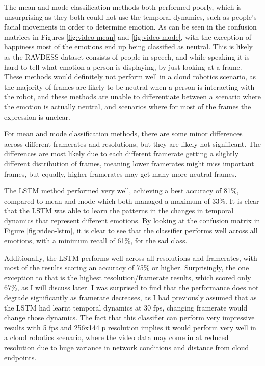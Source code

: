 \documentclass[sigconf]{acmart}
\begin{document}
{The mean and mode classification methods both performed poorly, which is
unsurprising as they both could not use the temporal dynamics, such as people's
facial movements in order to determine emotion. As can be seen in the
confusion matrices in Figures
\ref{fig:video-mean} and \ref{fig:video-mode}, with the exception of
happiness most of the emotions end up being classified as neutral. This is
likely as the RAVDESS dataset consists of people in speech, and while
speaking it is hard to tell what emotion a person is displaying, by just
looking at a frame. 
These methods would definitely not perform well in a cloud robotics scenario,
as the majority of frames are likely to be neutral when a person is
interacting with the robot, and these methods are unable to differentiate
between a scenario where the emotion is actually neutral, and scenarios where
for most of the frames the expression is unclear.

For mean and mode classification methods, there are some minor differences
across different framerates and resolutions, but they are likely not
significant. The differences are most likely due to each different framerate
getting a slightly different distribution of frames, meaning lower framerates
might miss important frames, but equally, higher framerates may get many more
neutral frames. 

The LSTM method performed very well, achieving a best accuracy of 81\%,
compared to mean and mode which both managed a maximum of 33\%. It is clear
that the LSTM was able to learn the patterns in the changes in temporal
dynamics that represent different emotions. By looking at the confusion matrix
in Figure \ref{fig:video-lstm}, it is clear to  see that the classifier
performs well across all emotions, with a minimum recall of 61\%, for the sad
class.

Additionally, the LSTM performs well across all resolutions and framerates,
with most of the results scoring an accuracy of 75\% or higher. Surprisingly,
the one exception to that is the highest resolution/framerate results, which
scored only 67\%, as I will discuss later. 
I was surprised to find that the performance does not degrade significantly as framerate
decreases, as I had previously assumed that as the LSTM had learnt temporal
dynamics at 30 fps, changing framerate would change those dynamics.
The fact that this classifier can
perform very impressive results with 5 fps and 256x144 p resolution implies it
would perform very well in a cloud robotics scenario, where the video data may
come in at reduced resolution due to huge variance in network conditions and
distance from cloud endpoints.

}
\end{document}
